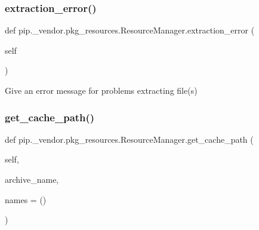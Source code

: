 \subsubsection{\texorpdfstring{extraction\+\_\+error()}{extraction\_error()}}
{\footnotesize\ttfamily def pip.\+\_\+vendor.\+pkg\+\_\+resources.\+Resource\+Manager.\+extraction\+\_\+error (\begin{DoxyParamCaption}\item[{}]{self }\end{DoxyParamCaption})}

\begin{DoxyVerb}Give an error message for problems extracting file(s)\end{DoxyVerb}
 \mbox{\label{classpip_1_1__vendor_1_1pkg__resources_1_1ResourceManager_abb9704b64700741ee3a3ad67f7cad5bd}} 
\subsubsection{\texorpdfstring{get\+\_\+cache\+\_\+path()}{get\_cache\_path()}}
{\footnotesize\ttfamily def pip.\+\_\+vendor.\+pkg\+\_\+resources.\+Resource\+Manager.\+get\+\_\+cache\+\_\+path (\begin{DoxyParamCaption}\item[{}]{self,  }\item[{}]{archive\+\_\+name,  }\item[{}]{names = {\ttfamily ()} }\end{DoxyParamCaption})}

